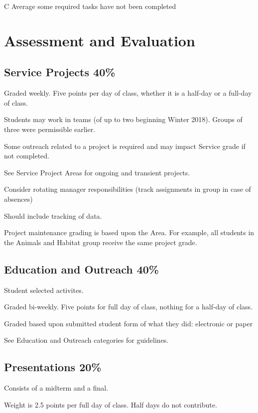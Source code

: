\documentclass[letterpaper,10pt]{memoir}
\begin{document}
C Average
some required tasks have not been completed



\newpage
\section*{Assessment and Evaluation}


	\subsection*{Service Projects \hfill 40\%}

	Graded weekly.	Five points per day of class, whether it is a half-day or a full-day of class.

	Students may work in teams (of up to two beginning Winter 2018). Groups of three were permissible earlier.

	Some outreach related to a project is required and may impact Service grade if not completed.

	See Service Project Areas for ongoing and transient projects.

	Consider rotating manager responsibilities (track assignments in group in case of absences)
	
	Should include tracking of data.

	Project maintenance grading is based upon the Area. For example, all students in the Animals and Habitat group receive the same project grade.


	\subsection*{Education and Outreach \hfill 40\%}

	Student selected activites.

	Graded bi-weekly. Five points for full day of class, nothing for a half-day of class.

	Graded based upon submitted student form of what they did: electronic or paper
	
	See Education and Outreach categories for guidelines.


	\subsection*{Presentations \hfill 20\%}

	Consists of a midterm and a final.
	
	Weight is 2.5 points per full day of class. Half days do not contribute.
\end{document}
